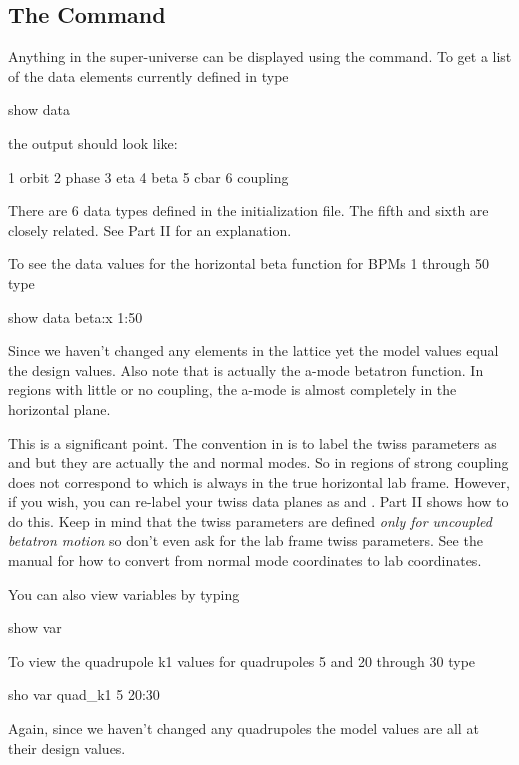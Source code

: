 \subsection{The  Command}

Anything in the super-universe can be displayed using the  command. To
get a list of the data elements currently defined in \tao type
\begin{example}
  show data
\end{example}
the output should look like:
\begin{example}
   1  orbit
   2  phase
   3  eta
   4  beta
   5  cbar
   6  coupling
\end{example}
There are 6 data types defined in the initialization file. The fifth and sixth are 
closely related. See Part II for an explanation.

To see the data values for the horizontal beta function for \cesr BPMs 1 through
50 type
\begin{example}
  show data beta:x 1:50
\end{example}
Since we haven't changed any elements in the lattice yet the model values equal
the design values. Also note that  is actually the a-mode betatron
function. In regions with little or no coupling, the a-mode is almost completely
in the horizontal plane.
 
This is a significant point. The convention in \bmad is to label the twiss
parameters as  and  but they are actually the  and 
normal modes. So
in regions of strong coupling  does not correspond to 
which is always in the true horizontal lab frame. 
However, if you wish, you can re-label your twiss data planes as  and
. Part II shows how to do this. Keep in mind that the twiss
parameters are defined \textit{only for uncoupled betatron motion} so don't even ask for the lab
frame twiss parameters. See the \bmad manual for how to convert
from normal mode coordinates to lab coordinates.

You can also view variables by typing
\begin{example}
  show var
\end{example}
To view the quadrupole k1 values for \cesr quadrupoles 5  and 20 through 30 type
\begin{example}
  sho var quad\_k1 5 20:30
\end{example}
Again, since we haven't changed any quadrupoles the model values are all at their
design values.


